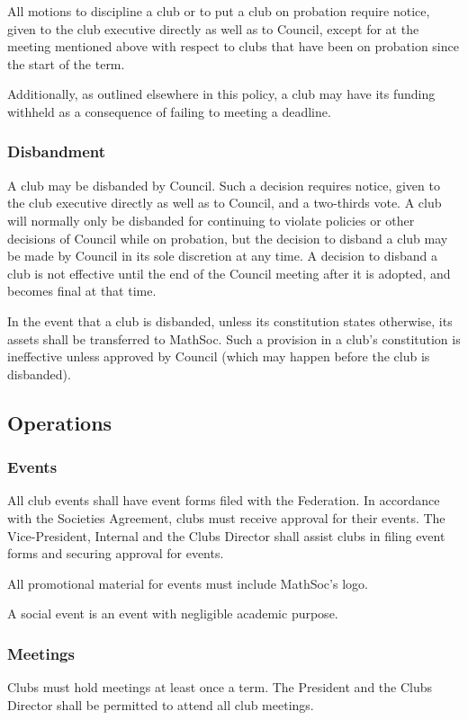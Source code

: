 All motions to discipline a club or to put a club on probation require notice,
given to the club executive directly as well as to Council, except for at the
meeting mentioned above with respect to clubs that have been on probation since
the start of the term.

Additionally, as outlined elsewhere in this policy, a club may have its funding
withheld as a consequence of failing to meeting a deadline.

\subsubsection{Disbandment}
A club may be disbanded by Council. Such a decision requires notice, given to
the club executive directly as well as to Council, and a two-thirds vote. A club
will normally only be disbanded for continuing to violate policies or other
decisions of Council while on probation, but the decision to disband a club may
be made by Council in its sole discretion at any time. A decision to disband a
club is not effective until the end of the Council meeting after it is adopted,
and becomes final at that time.

In the event that a club is disbanded, unless its constitution states otherwise,
its assets shall be transferred to MathSoc. Such a provision in a club's
constitution is ineffective unless approved by Council (which may happen before
the club is disbanded).

\subsection{Operations}
\subsubsection{Events}
All club events shall have event forms filed with the Federation. In accordance
with the Societies Agreement, clubs must receive approval for their events.  The
Vice-President, Internal and the Clubs Director shall assist clubs in filing
event forms and securing approval for events.

All promotional material for events must include MathSoc's logo.

A social event is an event with negligible academic purpose.

\subsubsection{Meetings}
Clubs must hold meetings at least once a term. The President and the Clubs
Director shall be permitted to attend all club meetings.

